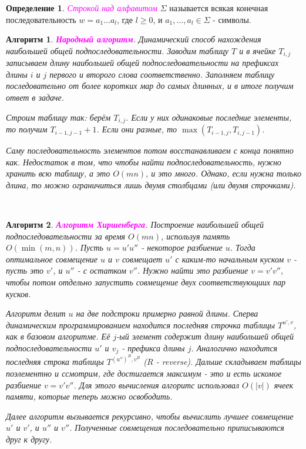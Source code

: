 \documentclass[a4paper]{article}
\theoremstyle{indented}
\newtheorem{alg}{Алгоритм}
\theoremstyle{definition}
\newtheorem{defn}{Определение}
\theoremstyle{remark}
\begin{document}
\begin{defn}
    \textcolor{magenta}{\hypertarget{d2}{\textit{Строкой над алфавитом}}} $\Sigma$ называется всякая конечная последовательность $w=a_1\ldots a_l$, где $l\geq 0$, и $a_1, \ldots, a_l \in \Sigma$ - символы.
\end{defn}

\begin{alg}
    \textcolor{magenta}{\hypertarget{t8}{\textbf{Народный алгоритм}}}. Динамический способ нахождения наибольшей общей подпоследовательности. Заводим таблицу $T$ и в ячейке $T_{i, j}$ записываем длину наибольшей общей подпоследовательности на префиксах длины $i$ и $j$ первого и второго слова соответственно. Заполняем таблицу последовательно от более коротких мар до самых длинных, и в итоге получим ответ в задаче. \ 

    Строим таблицу так: берём $T_{i, j}$. Если у них одинаковые последние элементы, то получим $T_{i-1, j-1}+1$. Если они разные, то $\max({T_{i-1, j}, T_{i, j-1}})$. \ 

    Саму последовательность элементов потом восстанавливаем с конца понятно как. Недостаток в том, что чтобы найти подпоследовательность, нужно хранить всю таблицу, а это $O(mn)$, и это много. Однако, если нужна только длина, то можно ограничиться лишь двумя столбцами (или двумя строчками).
\end{alg} \

\begin{alg}
    \textcolor{magenta}{\hypertarget{t9}{\textbf{Алгоритм Хиршенберга}}}. Построение наибольшей общей подпоследовательности за время $O(mn)$, используя память $O(\min(m, n))$. Пусть $u=u'u''$ - некоторое разбиение $u$. Тогда оптимальное совмещение $u$ и $v$ совмещает $u'$ с каким-то начальным куском $v$ - пусть это $v'$, и $u''$ - с остатком $v''$. Нужно найти это разбиение $v=v'v''$, чтобы потом отдельно запустить совмещение двух соответствующиих пар кусков. \ 

    Алгоритм делит $u$ на две подстроки примерно равной длины. Сперва динамическим программированием находится последняя строчка таблицы $T^{u', v}$, как в базовом алгоритме. Её $j$-ый элемент содержит длину наибольшей общей подпоследовательности $u'$ и $v_j$ - префикса длины $j$. Аналогично находится последняя строка таблицы $T^{(u'')^R, v^R}$ ($R$ - reverse). Дальше складываем таблицы поэлементно и ссмотрим, где достигается максимум - это и есть искомое разбиение $v=v'v''$. Для этого вычисления алгоритс использовал $O(|v|)$ ячеек памяти, которые теперь можно освободить. \ 

    Далее алгоритм вызывается рекурсивно, чтобы вычислить лучшее совмещение $u'$ и $v'$, и $u''$ и $v''$. Полученные совмещения последовательно приписываются друг к другу.
\end{alg} \
\end{document}
